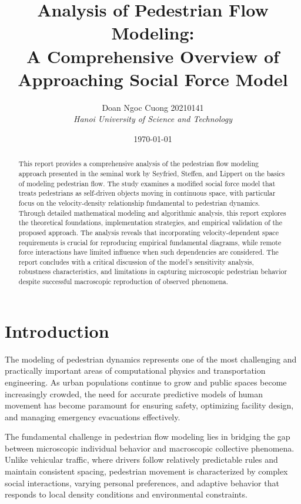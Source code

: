 \documentclass[12pt,a4paper]{article}
\title{\textbf{Analysis of Pedestrian Flow Modeling: \\
A Comprehensive Overview of Approaching Social Force Model}}
\author{Doan Ngoc Cuong 20210141 \\
\textit{Hanoi University of Science and Technology}}
\date{\today}
\begin{document}
\maketitle

\begin{abstract}
This report provides a comprehensive analysis of the pedestrian flow modeling approach presented in the seminal work by Seyfried, Steffen, and Lippert on the basics of modeling pedestrian flow. The study examines a modified social force model that treats pedestrians as self-driven objects moving in continuous space, with particular focus on the velocity-density relationship fundamental to pedestrian dynamics. Through detailed mathematical modeling and algorithmic analysis, this report explores the theoretical foundations, implementation strategies, and empirical validation of the proposed approach. The analysis reveals that incorporating velocity-dependent space requirements is crucial for reproducing empirical fundamental diagrams, while remote force interactions have limited influence when such dependencies are considered. The report concludes with a critical discussion of the model's sensitivity analysis, robustness characteristics, and limitations in capturing microscopic pedestrian behavior despite successful macroscopic reproduction of observed phenomena.
\end{abstract}

\newpage
\tableofcontents
\newpage

\section{Introduction}

The modeling of pedestrian dynamics represents one of the most challenging and practically important areas of computational physics and transportation engineering. As urban populations continue to grow and public spaces become increasingly crowded, the need for accurate predictive models of human movement has become paramount for ensuring safety, optimizing facility design, and managing emergency evacuations effectively.

The fundamental challenge in pedestrian flow modeling lies in bridging the gap between microscopic individual behavior and macroscopic collective phenomena. Unlike vehicular traffic, where drivers follow relatively predictable rules and maintain consistent spacing, pedestrian movement is characterized by complex social interactions, varying personal preferences, and adaptive behavior that responds to local density conditions and environmental constraints.
\end{document}
